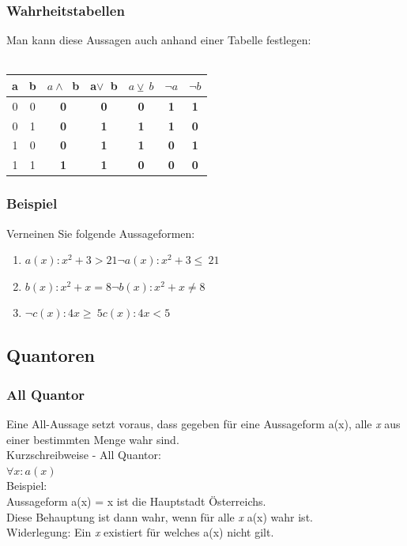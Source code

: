\documentclass{article}
\begin{document}
	\subsubsection{Wahrheitstabellen}
	Man kann diese Aussagen auch anhand einer Tabelle festlegen: \\ \\ 
	\begin{tabular}{| c | c | c | c | c | c | c |}
		\toprule
		a & b & $a \land\ $  b & a$ \lor\ $  b & $a \veebar\  b$ & $\neg a$ & $\neg b$ \\ \midrule
		0 & 0 & \textbf{0} & \textbf{0} & \textbf{0} & \textbf{1} & \textbf{1} \\ \hline
		0 & 1 & \textbf{0} & \textbf{1} & \textbf{1} & \textbf{1} & \textbf{0} \\ \hline
		1 & 0 & \textbf{0} & \textbf{1} & \textbf{1} & \textbf{0} & \textbf{1} \\ \hline
		1 & 1 & \textbf{1} & \textbf{1} & \textbf{0} & \textbf{0} & \textbf{0} \\
		\bottomrule
	\end{tabular}
	\subsubsection{Beispiel}
	Verneinen Sie folgende Aussageformen:
	\begin{enumerate}
		\item{$a(x): x^2 + 3 > 21 $\to$ \neg a(x):x^2+3 \leq\ 21$}
		\item{$b(x): x^2 + x = 8 $\to$ \neg b(x): x^2+x \neq 8$}
		\item{$\neg c(x): 4x \geq\ 5 $\to$ c(x): 4x < 5$}
	\end{enumerate}

	\subsection{Quantoren}
	\subsubsection{All Quantor}
	Eine All-Aussage setzt voraus, dass gegeben für eine Aussageform a(x), alle \textit{x} aus einer bestimmten Menge wahr sind. \\
	Kurzschreibweise - All Quantor: \\
	$\forall x:a(x)$ \\
	Beispiel:\\
	Aussageform a(x) = x ist die Hauptstadt Österreichs. \\
	Diese Behauptung ist dann wahr, wenn für alle \textit{x} a(x) wahr ist. \\
	Widerlegung: Ein \textit{x} existiert für welches a(x) nicht gilt.
\end{document}
